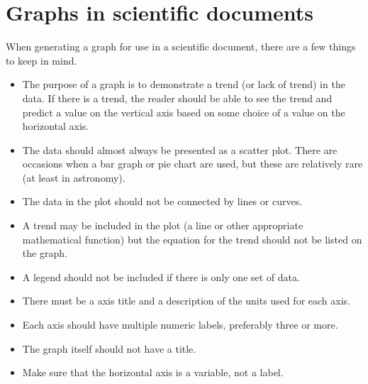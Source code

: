 \documentclass{exam}
\begin{document}


\section{Graphs in scientific documents}
When generating a graph for use in a scientific document, there are a few things to keep in mind.
\begin{itemize}
\item The purpose of a graph is to demonstrate a trend (or lack of trend) in the data. If there is a trend, the reader should be able to see the trend and predict a value on the vertical axis based on some choice of a value on the horizontal axis.
\item The data should almost always be presented as a scatter plot. There are occasions when a bar graph or pie chart are used, but these are relatively rare (at least in astronomy).
\item The data in the plot should not be connected by lines or curves.
\item A trend may be included in the plot (a line or other appropriate mathematical function) but the equation for the trend should not be listed on the graph.
\item A legend should not be included if there is only one set of data.
\item There must be a axis title and a description of the units used for each axis.
\item Each axis should have multiple numeric labels, preferably three or more.
\item The graph itself should not have a title.
\item Make sure that the horizontal axis is a variable, not a label.
\end{itemize}
\end{document}
